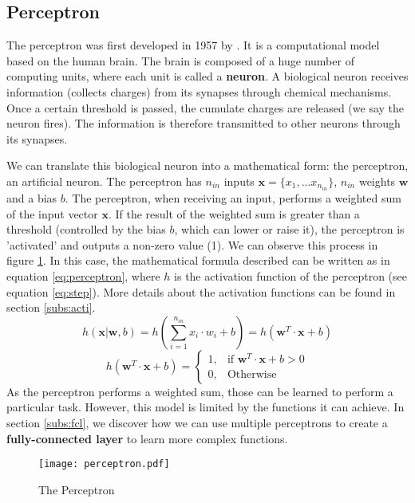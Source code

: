 \subsection{Perceptron} \label{subs:perceptron}
The perceptron was first developed in 1957 by \textcite{brain_perceptron_nodate}. It is a computational model based on the human brain. The brain is composed of a huge number of computing units, where each unit is called a \textbf{neuron}. A biological neuron receives information (collects charges) from its synapses through chemical mechanisms. Once a certain threshold is passed, the cumulate charges are released (we say the neuron fires). The information is therefore transmitted to other neurons through its synapses.

We can translate this biological neuron into a mathematical form: the perceptron, an artificial neuron. The perceptron has $n_{in}$ inputs $\boldsymbol{x} = \{ x_1, ... x_{n_{in}} \}$, $n_{in}$ weights $\boldsymbol{w}$ and a bias $b$. The perceptron, when receiving an input, performs a weighted sum of the input vector $\boldsymbol{x}$. If the result of the weighted sum is greater than a threshold (controlled by the bias $b$, which can lower or raise it), the perceptron is 'activated' and outputs a non-zero value (1). We can observe this process in figure \ref{fig:perceptron}.
In this case, the mathematical formula described can be written as in equation \eqref{eq:perceptron}, where $h$ is the activation function of the perceptron (see equation \eqref{eq:step}). More details about the activation functions can be found in section \ref{subs:acti}.
%
\begin{equation}
    h ( \boldsymbol{x} | \boldsymbol{w}, b) = h(\sum^{n_{in}}_{i=1} x_i \cdot w_i + b) = h ( \boldsymbol{w}^{T} \cdot \boldsymbol{x} + b)
    \label{eq:perceptron}
\end{equation}
%
\begin{equation}
    h ( \boldsymbol{w}^{T} \cdot \boldsymbol{x} + b) = \begin{cases} 1, & \mbox{if } \boldsymbol{w}^{T} \cdot \boldsymbol{x} + b > 0 \\ 0, & \mbox{Otherwise} \end{cases}
    \label{eq:step}
\end{equation}
%
As the perceptron performs a weighted sum, those can be learned to perform a particular task. However, this model is limited by the functions it can achieve. In section \ref{subs:fcl}, we discover how we can use multiple perceptrons to create a \textbf{fully-connected layer} to learn more complex functions.
%
\begin{figure}
    \centering
    \texttt{[image: perceptron.pdf]}
    \caption{The Perceptron}
    \label{fig:perceptron}
\end{figure}
